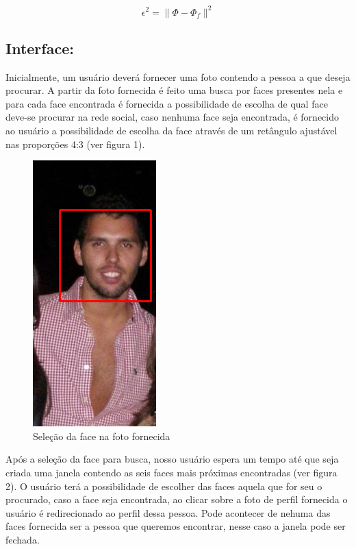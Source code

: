 \documentclass[10pt,a4paper]{article}
\begin{document}
\begin{equation}
\epsilon^2=\|\Phi-\Phi_f\|^2
\end{equation}

\subsection*{Interface:}
Inicialmente, um usuário deverá fornecer uma foto contendo a pessoa a que deseja procurar. A partir da foto fornecida é feito uma busca por faces presentes nela e para cada face encontrada é fornecida a possibilidade de escolha de qual face deve-se procurar na rede social, caso nenhuma face seja encontrada, é fornecido ao usuário a possibilidade de escolha da face através de um retângulo ajustável nas proporções 4:3 (ver figura 1).

\begin{figure}[h!]
\begin{center}
\includegraphics[scale=0.4]{samephoto}
\caption{ Seleção da face na foto fornecida}
\end{center}
\end{figure}

Após a seleção da face para busca, nosso usuário espera um tempo até que seja criada uma janela contendo as seis faces mais próximas encontradas (ver figura 2). O usuário terá a possibilidade de escolher das faces aquela que for seu o procurado, caso a face seja encontrada, ao clicar sobre a foto de perfil fornecida o usuário é redirecionado ao perfil dessa pessoa.
Pode acontecer de nehuma das faces fornecida ser a pessoa que queremos encontrar, nesse caso a janela pode ser fechada.
\end{document}
